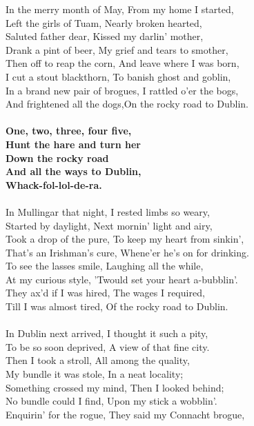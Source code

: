 In the merry month of May, From my home I started,\\
Left the girls of Tuam, Nearly broken hearted,\\
Saluted father dear, Kissed my darlin' mother,\\
Drank a pint of beer, My grief and tears to smother,\\
Then off to reap the corn, And leave where I was born,\\
I cut a stout blackthorn, To banish ghost and goblin,\\
In a brand new pair of brogues, I rattled o'er the bogs,\\
And frightened all the dogs,On the rocky road to Dublin. \\
\\
\textbf{One, two, three, four five,\\
Hunt the hare and turn her\\
Down the rocky road\\
And all the ways to Dublin,\\
Whack-fol-lol-de-ra.\\}
\\
In Mullingar that night, I rested limbs so weary,\\
Started by daylight, Next mornin' light and airy,\\
Took a drop of the pure, To keep my heart from sinkin',\\
That's an Irishman's cure, Whene'er he's on for drinking.\\
To see the lasses smile, Laughing all the while,\\
At my curious style, 'Twould set your heart a-bubblin'.\\
They ax'd if I was hired, The wages I required,\\
Till I was almost tired, Of the rocky road to Dublin. \\
\\
In Dublin next arrived, I thought it such a pity,\\
To be so soon deprived, A view of that fine city.\\
Then I took a stroll, All among the quality,\\
My bundle it was stole, In a neat locality;\\
Something crossed my mind, Then I looked behind;\\
No bundle could I find, Upon my stick a wobblin'.\\
Enquirin' for the rogue, They said my Connacht brogue,\\
